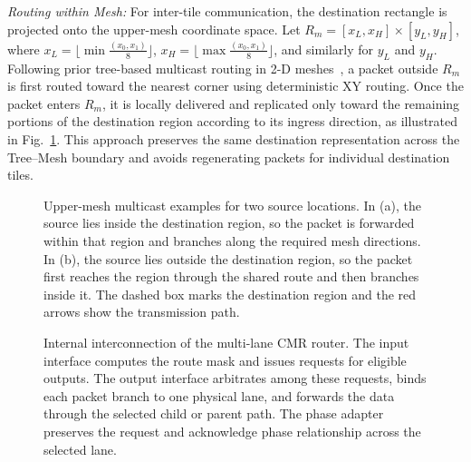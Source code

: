\documentclass[conference]{IEEEtran}
\begin{document}
\emph{Routing within Mesh:}
For inter-tile communication, the
destination rectangle is projected onto the upper-mesh coordinate space.
Let
\(R_m = [x_L,x_H] \times [y_L,y_H]\), where
\(x_{L} = \lfloor\min\frac{\left( x_{0},x_{1} \right)}{8}\rfloor\),
\(x_{H} = \lfloor\max\frac{\left( x_{0},x_{1} \right)}{8}\rfloor\), and
similarly for \(y_{L}\) and \(y_{H}\). Following prior tree-based multicast routing in 2-D meshes~\cite{wang2009rpm}, a packet outside \(R_m\) is
first routed toward the nearest corner using deterministic XY routing.
Once the packet enters \(R_{m}\), it is locally delivered and replicated
only toward the remaining portions of the destination region according
to its ingress direction, as illustrated in Fig.~\ref{fig:mesh-multicast}. This approach
preserves the same destination representation across the Tree--Mesh
boundary and avoids regenerating packets for individual destination
tiles.

\begin{figure}[!t]
\centering

\caption{Upper-mesh multicast examples for two source locations. In (a), the
source lies inside the destination region, so the packet is forwarded within
that region and branches along the required mesh directions. In (b), the
source lies outside the destination region, so the packet first reaches the
region through the shared route and then branches inside it. The dashed box
marks the destination region and the red arrows show the transmission path.}
\label{fig:mesh-multicast}
\end{figure}

\begin{figure}[!b]
\centering

\caption{Internal interconnection of the multi-lane CMR router. The input
interface computes the route mask and issues requests for eligible outputs.
The output interface arbitrates among these requests, binds each packet
branch to one physical lane, and forwards the data through the selected child
or parent path. The phase adapter preserves the request and acknowledge
phase relationship across the selected lane.}
\label{fig:router}
\end{figure}
\end{document}
